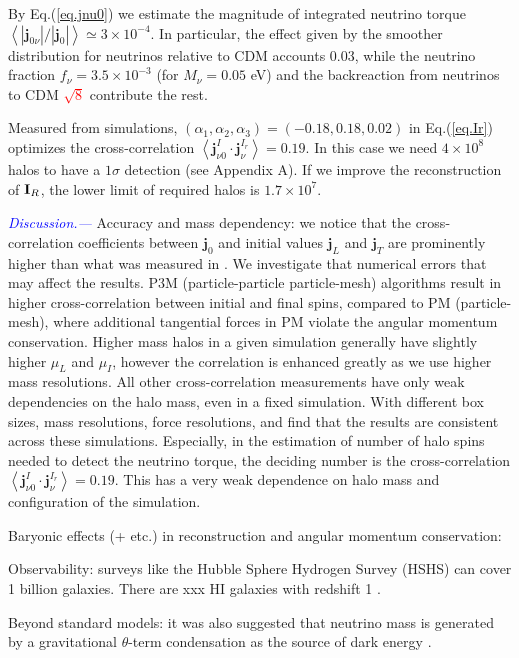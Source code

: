\documentclass[aps,prd,twocolumn,amsmath,amssymb,amsfont,superscriptaddress]{revtex4-1}
\newcommand{\bs}{\boldsymbol}
\newcommand{\I}{\bold{I}}
\newcommand{\spin}{\bs{j}}
\newcommand{\tcb}{\textcolor{blue}}
\newcommand{\tcr}{\textcolor{red}}
\begin{document}
By Eq.(\ref{eq.jnu0}) we estimate the magnitude of integrated neutrino torque $\left\langle|\spin_{0\nu}|/|\spin_0|\right\rangle\simeq 3\times10^{-4}$. In particular, the effect given by the smoother distribution for neutrinos relative to CDM accounts 0.03, while the neutrino fraction $f_\nu=3.5\times 10^{-3}$ (for $M_\nu=0.05$ eV) and the backreaction from neutrinos to CDM \tcr{$\sqrt{8}$} contribute the rest.

Measured from simulations, $(\alpha_1,\alpha_2,\alpha_3)=(-0.18,0.18,0.02)$ in Eq.(\ref{eq.Ir}) optimizes the cross-correlation $\left\langle\spin^I_{\nu 0}\cdot\spin^{I_r}_\nu\right\rangle=0.19$. In this case we need $4\times 10^8$ halos to have a $1\sigma$ detection (see Appendix A). If we improve the reconstruction of $\I_R$, the lower limit of required halos is $1.7\times 10^7$. 

\tcb{\textit{Discussion.---}} 
Accuracy and mass dependency: we notice that the cross-correlation coefficients between $\spin_0$ and initial values $\spin_L$ and $\spin_T$ are prominently higher than what was measured in \citep{2000ApJ...532L...5L}. We investigate that numerical errors that may affect the results. P3M (particle-particle particle-mesh) algorithms result in higher cross-correlation between initial and final spins, compared to PM (particle-mesh), where additional tangential forces in PM violate the angular momentum conservation. Higher mass halos in a given simulation generally have slightly higher $\mu_L$ and $\mu_I$, however the correlation is enhanced greatly as we use higher mass resolutions. All other cross-correlation measurements have only weak dependencies on the halo mass, even in a fixed simulation. With different box sizes, mass resolutions, force resolutions, and find that the results are consistent across these simulations. Especially, in the estimation of number of halo spins needed to detect the neutrino torque, the deciding number is the cross-correlation $\left\langle\spin^I_{\nu 0}\cdot\spin^{I_r}_\nu\right\rangle=0.19$. This has a very weak dependence on halo mass and configuration of the simulation.

Baryonic effects (+ etc.) in reconstruction and angular momentum conservation:

Observability: surveys like the Hubble Sphere Hydrogen Survey (HSHS) \citep{2006astro.ph..6104P} can cover 1 billion galaxies. There are xxx HI galaxies with redshift 1 \citep{2004MNRAS.350.1210Z}.

Beyond standard models: it was also suggested that neutrino mass is generated by a gravitational $\theta$-term condensation as the source of dark energy \citep{2016PhRvD..93k3002D}.
\end{document}
